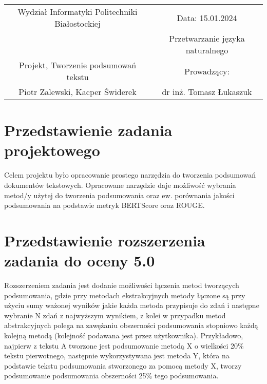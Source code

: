 \documentclass{article}
\begin{document}
\begin{center}
\begin{tabular}{|c|c|}

\hline 
		Wydział Informatyki Politechniki Białostockiej & Data: 15.01.2024  \\
					   								   & Przetwarzanie języka naturalnego \\
\hline
		Projekt, Tworzenie podsumowań tekstu & Prowadzący: \\
		Piotr Zalewski, Kacper Świderek & dr inż. Tomasz Łukaszuk \\
\hline 

\end{tabular}
\end{center}

\section{Przedstawienie zadania projektowego}
Celem projektu było opracowanie prostego narzędzia do tworzenia 
podsumowań dokumentów tekstowych. Opracowane narzędzie daje możliwość 
wybrania metod/y użytej do tworzenia podsumowania oraz ew. porównania
jakości podsumowania na podstawie metryk BERTScore oraz ROUGE.
\section{Przedstawienie rozszerzenia zadania do oceny 5.0}
Rozszerzeniem zadania jest dodanie możliwości łączenia metod tworzących 
podsumowania, gdzie przy metodach ekstrakcyjnych metody łączone są
przy użyciu sumy ważonej wyników jakie każda metoda przypisuje do zdań
i następne wybranie N zdań z najwyższym wynikiem, z kolei w przypadku metod
abstrakcyjnych polega na zawężaniu obszerności podsumowania stopniowo
każdą kolejną metodą (kolejność podawana jest przez użytkownika). Przykładowo,
najpierw z tekstu A tworzone jest podsumowanie metodą X o wielkości 20\% tekstu 
pierwotnego, następnie wykorzystywana jest metoda Y, która na podstawie tekstu podsumowania
stworzonego za pomocą metody X, tworzy podsumowanie podsumowania obszerności 25\%
tego podsumowania. 
\end{document}
